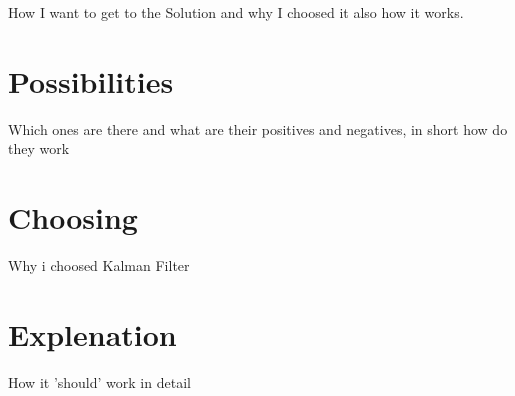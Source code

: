 
  How I want to get to the Solution and why I choosed it also how it works.
  
  \section{Possibilities}
  Which ones are there and what are their positives and negatives, in short how do they work
  
  \section{Choosing}
  Why i choosed Kalman Filter
  
  \section{Explenation}
  How it 'should' work in detail
  
